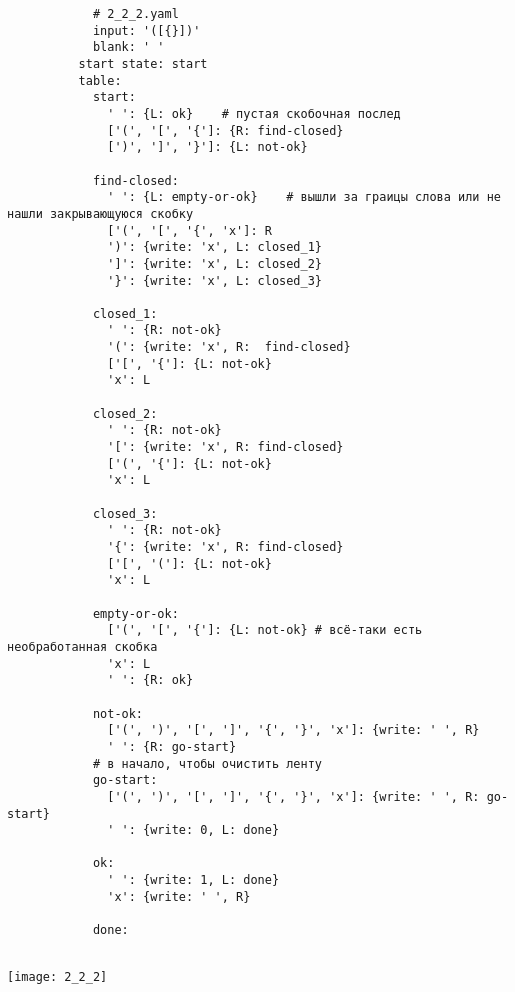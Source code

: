 \documentclass[a4paper,12pt]{article}
\begin{document}
        \begin{verbatim}
            # 2_2_2.yaml
            input: '([{}])'
            blank: ' '
          start state: start
          table:
            start:
              ' ': {L: ok}    # пустая скобочная послед
              ['(', '[', '{']: {R: find-closed}
              [')', ']', '}']: {L: not-ok}
              
            find-closed:
              ' ': {L: empty-or-ok}    # вышли за граицы слова или не нашли закрывающуюся скобку
              ['(', '[', '{', 'x']: R
              ')': {write: 'x', L: closed_1}
              ']': {write: 'x', L: closed_2}
              '}': {write: 'x', L: closed_3}
            
            closed_1:
              ' ': {R: not-ok}
              '(': {write: 'x', R:  find-closed}
              ['[', '{']: {L: not-ok}
              'x': L
            
            closed_2:
              ' ': {R: not-ok}
              '[': {write: 'x', R: find-closed}
              ['(', '{']: {L: not-ok}
              'x': L
            
            closed_3:
              ' ': {R: not-ok}
              '{': {write: 'x', R: find-closed}
              ['[', '(']: {L: not-ok}
              'x': L 
              
            empty-or-ok:
              ['(', '[', '{']: {L: not-ok} # всё-таки есть необработанная скобка
              'x': L
              ' ': {R: ok}
              
            not-ok:
              ['(', ')', '[', ']', '{', '}', 'x']: {write: ' ', R}
              ' ': {R: go-start}
            # в начало, чтобы очистить ленту
            go-start:
              ['(', ')', '[', ']', '{', '}', 'x']: {write: ' ', R: go-start}
              ' ': {write: 0, L: done}
              
            ok:
              ' ': {write: 1, L: done}
              'x': {write: ' ', R}
            
            done:
    
        \end{verbatim}
        \begin{center}
            \texttt{[image: 2\_2\_2]} \\
        \end{center}
        
\end{document}
